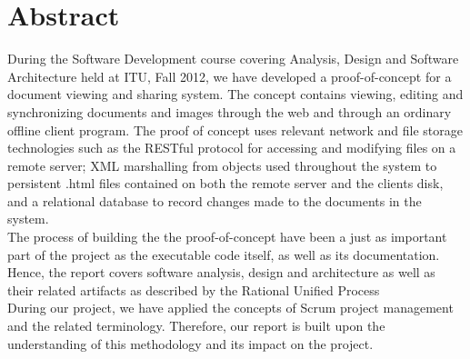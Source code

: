 \section{Abstract}
During the Software Development course covering Analysis, Design and Software Architecture held at ITU, Fall 2012, we have developed a proof-of-concept for a document viewing and sharing system. The concept contains viewing, editing and synchronizing documents and images through the web and through an ordinary offline client program. 
The proof of concept uses relevant network and file storage technologies such as the RESTful protocol for accessing and modifying files on a remote server; XML marshalling from objects used throughout the system to persistent .html files contained on both the remote server and the clients disk, and a relational database to record changes made to the documents in the system.\\
\newline
The process of building the the proof-of-concept have been a just as important part of the project as the executable code itself, as well as its documentation. Hence, the report covers software analysis, design and architecture as well as their related artifacts as described by the Rational Unified Process \cite[p.~38]{OOAD}\\
\newline
During our project, we have applied the concepts of Scrum project management and the related terminology. Therefore, our report is built upon the understanding of this methodology and its impact on the project.
\newpage
